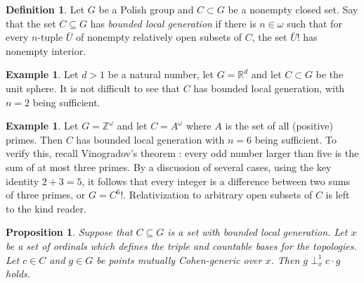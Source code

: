 \documentclass{article}
\newcommand{\gw}{\omega}
\newtheorem{proposition}[theorem]{Proposition}
\theoremstyle{definition}
\newtheorem{definition}[theorem]{Definition}
\newtheorem{example}[theorem]{Example}
\begin{document}
\begin{definition}
Let $G$ be a Polish group and $C\subset G$ be a nonempty closed set. Say that the set $C\subseteq G$ has \emph{bounded local generation} if there is $n\in\gw$ such that for every $n$-tuple $\bar U$ of nonempty relatively open subsets of $C$, the set $\bar U!$ has nonempty interior.
\end{definition}

\begin{example}
\label{sphereexample}
Let $d>1$ be a natural number, let $G=\mathbb{R}^d$ and let $C\subset G$ be the unit sphere. It is not difficult to see that $C$ has bounded local generation, with $n=2$ being sufficient.
\end{example}

\begin{example}
Let $G=\mathbb{Z}^\gw$ and let $C=A^\gw$ where $A$ is the set of all (positive) primes. Then $C$ has bounded local generation with $n=6$ being sufficient. To verify this, recall Vinogradov's theorem \cite{nathanson:bases}: every odd number larger than five is the sum of at most three primes. By a discussion of several cases, using the key identity $2+3=5$, it follows that every integer is a difference between two sums of three primes, or $G=C^6!$. Relativization to arbitrary open subsets of $C$ is left to the kind reader.
\end{example}


\begin{proposition}
\label{turbidproposition}
Suppose that $C\subseteq G$ is a set with bounded local generation. Let $x$ be a set of ordinals which defines the triple and countable bases for the topologies. Let $c\in C$ and $g\in G$ be points mutually Cohen-generic over $x$. Then $g\perp^1_xc\cdot g$ holds.
\end{proposition}
\end{document}
